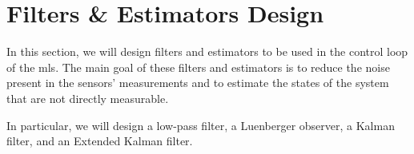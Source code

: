 \section{Filters \& Estimators Design}
\label{sec:filters_estimators_design}

In this section, we will design filters and estimators to be used in the control loop of the \acrshort{mls}.
The main goal of these filters and estimators is to reduce the noise present in the sensors' measurements and to estimate the states of the system that are not directly measurable.

In particular, we will design a low-pass filter, a Luenberger observer, a Kalman filter, and an Extended Kalman filter.





